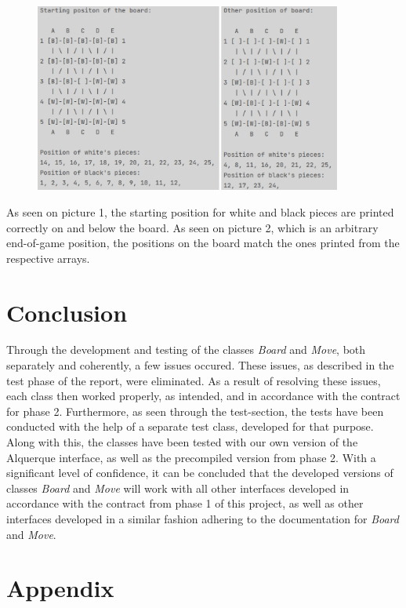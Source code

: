 \documentclass[12pt, a4paper]{article}
\begin{document}
\begin{figure}[h]
	\centering
	\includegraphics[width=0.9\textwidth]{2in1.png}	
\end{figure}

As seen on picture 1, the starting position for white and black pieces are printed correctly on and below the board.
As seen on picture 2, which is an arbitrary end-of-game position, the positions on the board match the ones printed from the respective arrays.

\newpage

\section{Conclusion}
Through the development and testing of the classes \emph{Board} and \emph{Move}, both separately and coherently, a few issues occured. These issues, as described in the test phase of the report, were eliminated. As a result of resolving these issues, each class then worked properly, as intended, and in accordance with the contract for phase 2. Furthermore, as seen through the test-section, the tests have been conducted with the help of a separate test class, developed for that purpose. Along with this, the classes have been tested with our own version of the Alquerque interface, as well as the precompiled version from phase 2. With a significant level of confidence, it can be concluded that the developed versions of classes \emph{Board} and \emph{Move} will work with all other interfaces developed in accordance with the contract from phase 1 of this project, as well as other interfaces developed in a similar fashion adhering to the documentation for \emph{Board} and \emph{Move}.


\newpage

\section{Appendix}
\end{document}
